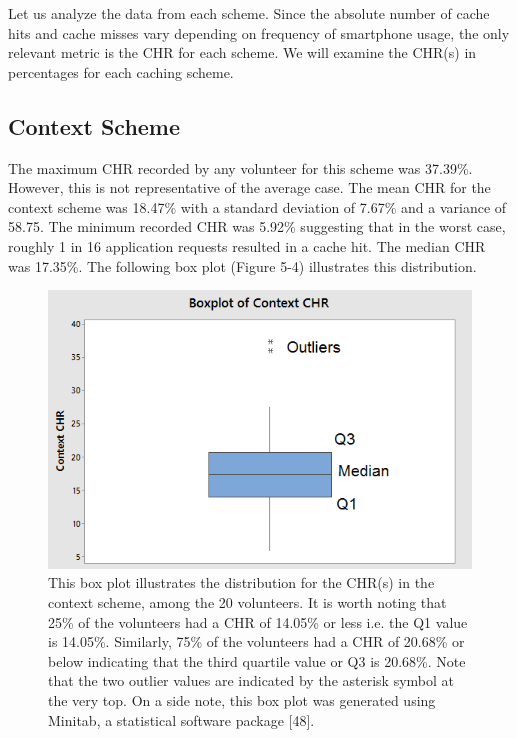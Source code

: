 \documentclass[12pt]{uthesis-v12}  %
\begin{document}
			Let us analyze the data from each scheme. Since the absolute number of cache hits and cache misses vary depending on frequency of smartphone usage, the only relevant metric is the CHR for each scheme. We will examine the CHR(s) in percentages for each caching scheme.
			
			\subsection{Context Scheme}
				The maximum CHR recorded by any volunteer for this scheme was 37.39\%. However, this is not representative of the average case. The mean CHR for the context scheme was 18.47\% with a standard deviation of 7.67\% and a variance of 58.75. The minimum recorded CHR was 5.92\% suggesting that in the worst case, roughly 1 in 16 application requests resulted in a cache hit. The median CHR was 17.35\%. The following box plot (Figure 5-4) illustrates this distribution.
				
				\begin{figure}[h]
					\centering
					\includegraphics[width = 130mm]{images/contextScheme.png}
					\caption[Distribution of CHR for Context Scheme]{This box plot illustrates the distribution for the CHR(s) in the context scheme, among the 20 volunteers. It is worth noting that 25\% of the volunteers had a CHR of 14.05\% or less i.e. the Q1 value is 14.05\%. Similarly, 75\% of the volunteers had a CHR of 20.68\% or below indicating that the third quartile value or Q3 is 20.68\%. Note that the two outlier values are indicated by the asterisk symbol at the very top. On a side note, this box plot was generated using Minitab, a statistical software package [48].}
				\end{figure}
				
\end{document}
